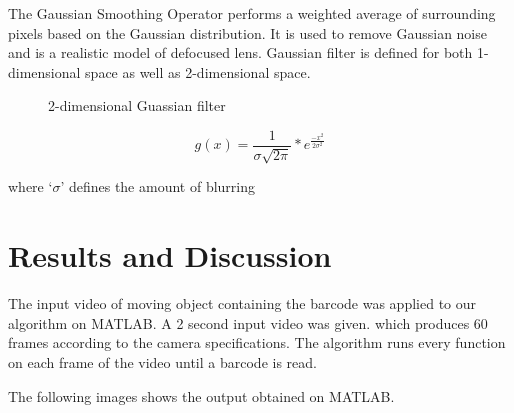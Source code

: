 \documentclass[times, 1pt, a4paper]{article}
\begin{document}
The Gaussian Smoothing Operator performs a weighted average of surrounding pixels based on the Gaussian distribution. It is used to remove Gaussian noise and is a realistic model of defocused lens. Gaussian filter is defined for both 1-dimensional space as well as 2-dimensional space. 

  \begin{figure}[h] 
	\centering
	\centering
	\caption{2-dimensional Guassian filter}
	\label{fig:guassian}
	\end{figure}

$$ g(x) = \frac{1}{\sigma \sqrt{2\pi}} * e^\frac{-x^2}{2\sigma^2} $$

where `$\sigma$' defines the amount of blurring

\section{Results and Discussion} \label{section:results}

The input video of moving object containing the barcode was applied to our algorithm on MATLAB. 
A 2 second input video was given. which produces 60 frames according to the camera specifications. The algorithm runs every function on each frame of the video until a barcode is read.

The following images shows the output obtained on MATLAB.
\end{document}
